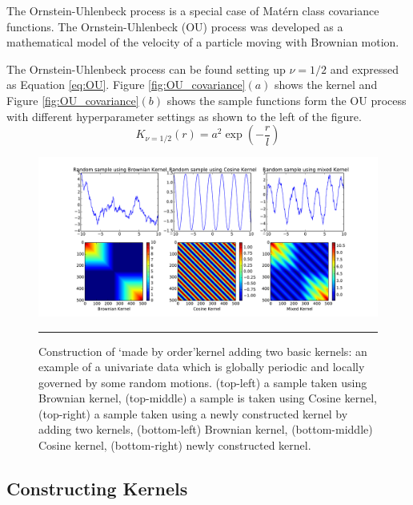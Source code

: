 The Ornstein-Uhlenbeck process \cite{Ornstein_Uhlenbeck:1930} is a special case of Mat{\'e}rn class covariance functions. The Ornstein-Uhlenbeck (OU) process was developed as a mathematical model of the velocity of a particle moving with Brownian motion.

The Ornstein-Uhlenbeck process can be found setting up $\nu=1/2$ and expressed as Equation \ref{eq:OU}. Figure \ref{fig:OU_covariance}$(a)$ shows the kernel and Figure \ref{fig:OU_covariance}$(b)$ shows the sample functions form the OU process  with different hyperparameter settings as shown to the left of the figure.  
\begin{equation} \label{eq:OU}
K_{\nu=1/2}(r)= a^2 \exp \left(-\frac{r}{l} \right)
\end{equation}


\begin{figure}[!htbp]
	\centering
	\includegraphics[width=\textwidth,keepaspectratio]{diagrams/ConstructKernels_BR_Cos.pdf}
	\rule{45em}{0.5pt}
	\caption[Construction of a new kernel adding two basic kernels]
	{Construction of \lq made by order\rq kernel adding two basic kernels: an example of a univariate data which is globally periodic and locally governed by some random motions. (top-left) a sample taken using Brownian kernel, (top-middle) a sample is taken using Cosine kernel, (top-right) a sample taken using a newly constructed kernel by adding two kernels, (bottom-left) Brownian kernel, (bottom-middle) Cosine kernel, (bottom-right) newly constructed kernel.} 
	\label{fig:ConstructKernels_BR_Cos}
\end{figure}

\subsection{Constructing Kernels}

